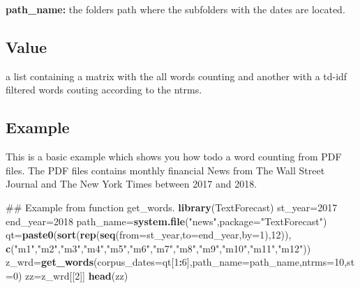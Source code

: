 \documentclass[]{article}
\newenvironment{Shaded}{\begin{snugshade}}{\end{snugshade}}
\newcommand{\KeywordTok}[1]{\textcolor[rgb]{0.13,0.29,0.53}{\textbf{#1}}}
\newcommand{\DataTypeTok}[1]{\textcolor[rgb]{0.13,0.29,0.53}{#1}}
\newcommand{\DecValTok}[1]{\textcolor[rgb]{0.00,0.00,0.81}{#1}}
\newcommand{\StringTok}[1]{\textcolor[rgb]{0.31,0.60,0.02}{#1}}
\newcommand{\OperatorTok}[1]{\textcolor[rgb]{0.81,0.36,0.00}{\textbf{#1}}}
\newcommand{\NormalTok}[1]{#1}
\begin{document}
\textbf{path\_name:} the folders path where the subfolders with the
dates are located.

\subsection{Value}\label{value}

a list containing a matrix with the all words counting and another with
a td-idf filtered words couting according to the ntrms.

\subsection{Example}\label{example}

This is a basic example which shows you how todo a word counting from
PDF files. The PDF files contains monthly financial News from The Wall
Street Journal and The New York Times between 2017 and 2018.

\begin{Shaded}
\begin{Highlighting}[]
\NormalTok{## Example from function get_words. }
\KeywordTok{library}\NormalTok{(TextForecast)}
\NormalTok{st_year=}\DecValTok{2017}
\NormalTok{end_year=}\DecValTok{2018}
\NormalTok{path_name=}\KeywordTok{system.file}\NormalTok{(}\StringTok{"news"}\NormalTok{,}\DataTypeTok{package=}\StringTok{"TextForecast"}\NormalTok{)}
\NormalTok{qt=}\KeywordTok{paste0}\NormalTok{(}\KeywordTok{sort}\NormalTok{(}\KeywordTok{rep}\NormalTok{(}\KeywordTok{seq}\NormalTok{(}\DataTypeTok{from=}\NormalTok{st_year,}\DataTypeTok{to=}\NormalTok{end_year,}\DataTypeTok{by=}\DecValTok{1}\NormalTok{),}\DecValTok{12}\NormalTok{)),}
\KeywordTok{c}\NormalTok{(}\StringTok{"m1"}\NormalTok{,}\StringTok{"m2"}\NormalTok{,}\StringTok{"m3"}\NormalTok{,}\StringTok{"m4"}\NormalTok{,}\StringTok{"m5"}\NormalTok{,}\StringTok{"m6"}\NormalTok{,}\StringTok{"m7"}\NormalTok{,}\StringTok{"m8"}\NormalTok{,}\StringTok{"m9"}\NormalTok{,}\StringTok{"m10"}\NormalTok{,}\StringTok{"m11"}\NormalTok{,}\StringTok{"m12"}\NormalTok{))}
\NormalTok{z_wrd=}\KeywordTok{get_words}\NormalTok{(}\DataTypeTok{corpus_dates=}\NormalTok{qt[}\DecValTok{1}\OperatorTok{:}\DecValTok{6}\NormalTok{],}\DataTypeTok{path_name=}\NormalTok{path_name,}\DataTypeTok{ntrms=}\DecValTok{10}\NormalTok{,}\DataTypeTok{st=}\DecValTok{0}\NormalTok{)}
\NormalTok{zz=z_wrd[[}\DecValTok{2}\NormalTok{]]}
\KeywordTok{head}\NormalTok{(zz)}
\end{Highlighting}
\end{Shaded}
\end{document}
